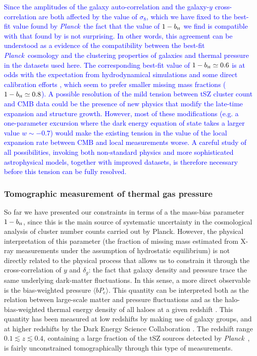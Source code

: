 \documentclass[useAMS,usenatbib]{mn2e}
\newcommand{\DA}[1]{\textcolor{blue}{#1}}
\def\bH{b_{\scriptscriptstyle\rm H}}
\def\planck{{\it Planck\/}}
\begin{document}
      \DA{Since the amplitudes of the galaxy auto-correlation and the galaxy-$y$ cross-correlation are both affected by the value of $\sigma_8$, which we have fixed to the best-fit value found by \planck\, the fact that the value of $1-\bH$ we find is compatible with that found by \cite{2016A&A...594A..24P} is not surprising. In other words, this agreement can be understood as a evidence of the compatibility between the best-fit \planck\ cosmology and the clustering properties of galaxies and thermal pressure in the datasets used here. The corresponding best-fit value of $1-\bH\simeq0.6$ is at odds with the expectation from hydrodynamical simulations \citep{2016ApJ...827..112B} and some direct calibration efforts \citep[e.g.][]{2016MNRAS.456L..74S,2019A&A...621A..40E}, which seem to prefer smaller missing mass fractions ($1-\bH\simeq0.8$). A possible resolution of the mild tension between tSZ cluster count and CMB data could be the presence of new physics that modify the late-time expansion and structure growth. However, most of these modifications (e.g. a one-parameter excursion where the dark energy equation of state takes a larger value $w\sim-0.7$) would make the existing tension in the value of the local expansion rate between CMB and local measurements \citep{2019ApJ...876...85R} worse. A careful study of all possibilities, invoking both non-standard physics and more sophisticated astrophysical models, together with improved datasets, is therefore necessary before this tension can be fully resolved.}

    \subsubsection{Tomographic measurement of thermal gas pressure}\label{ssec:results.fid.bpe}
      So far we have presented our constraints in terms of a the mass-bias parameter $1-\bH$, since this is the main source of systematic uncertainty in the cosmological analysis of cluster number counts carried out by Planck. However, the physical interpretation of this parameter (the fraction of missing mass estimated from X-ray measurements under the assumption of hydrostatic equilibrium) is not directly related to the physical process that allows us to constrain it through the cross-correlation of $y$ and $\delta_g$: the fact that galaxy density and pressure trace the same underlying dark-matter fluctuations. In this sense, a more direct observable is the bias-weighted pressure $\langle bP_e\rangle$. This quantity can be interpreted both as the relation between large-scale matter and pressure fluctuations and as the halo-bias-weighted thermal energy density of all haloes at a given redshift \citep{2017JCAP...11..040B}. This quantity has been measured at low  redshifts by \cite{2017MNRAS.467.2315V} making use of galaxy groups, and at higher redshifts by the Dark Energy Science Collaboration \citep{2019arXiv190413347P}. The redshift range $0.1\lesssim z\lesssim0.4$, containing a large fraction of the tSZ sources detected by \planck\ \citep{2016A&A...594A..27P}, is fairly unconstrained tomographically through this type of measurements.
\end{document}
